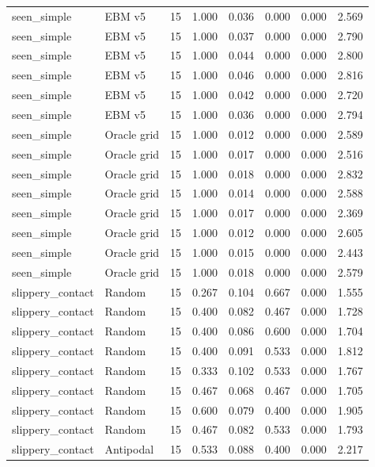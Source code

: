 {\begin{longtable}{llrrrrrr}
seen\_simple & EBM v5 & 15 & 1.000 & 0.036 & 0.000 & 0.000 & 2.569 \\
seen\_simple & EBM v5 & 15 & 1.000 & 0.037 & 0.000 & 0.000 & 2.790 \\
seen\_simple & EBM v5 & 15 & 1.000 & 0.044 & 0.000 & 0.000 & 2.800 \\
seen\_simple & EBM v5 & 15 & 1.000 & 0.046 & 0.000 & 0.000 & 2.816 \\
seen\_simple & EBM v5 & 15 & 1.000 & 0.042 & 0.000 & 0.000 & 2.720 \\
seen\_simple & EBM v5 & 15 & 1.000 & 0.036 & 0.000 & 0.000 & 2.794 \\
seen\_simple & Oracle grid & 15 & 1.000 & 0.012 & 0.000 & 0.000 & 2.589 \\
seen\_simple & Oracle grid & 15 & 1.000 & 0.017 & 0.000 & 0.000 & 2.516 \\
seen\_simple & Oracle grid & 15 & 1.000 & 0.018 & 0.000 & 0.000 & 2.832 \\
seen\_simple & Oracle grid & 15 & 1.000 & 0.014 & 0.000 & 0.000 & 2.588 \\
seen\_simple & Oracle grid & 15 & 1.000 & 0.017 & 0.000 & 0.000 & 2.369 \\
seen\_simple & Oracle grid & 15 & 1.000 & 0.012 & 0.000 & 0.000 & 2.605 \\
seen\_simple & Oracle grid & 15 & 1.000 & 0.015 & 0.000 & 0.000 & 2.443 \\
seen\_simple & Oracle grid & 15 & 1.000 & 0.018 & 0.000 & 0.000 & 2.579 \\
slippery\_contact & Random & 15 & 0.267 & 0.104 & 0.667 & 0.000 & 1.555 \\
slippery\_contact & Random & 15 & 0.400 & 0.082 & 0.467 & 0.000 & 1.728 \\
slippery\_contact & Random & 15 & 0.400 & 0.086 & 0.600 & 0.000 & 1.704 \\
slippery\_contact & Random & 15 & 0.400 & 0.091 & 0.533 & 0.000 & 1.812 \\
slippery\_contact & Random & 15 & 0.333 & 0.102 & 0.533 & 0.000 & 1.767 \\
slippery\_contact & Random & 15 & 0.467 & 0.068 & 0.467 & 0.000 & 1.705 \\
slippery\_contact & Random & 15 & 0.600 & 0.079 & 0.400 & 0.000 & 1.905 \\
slippery\_contact & Random & 15 & 0.467 & 0.082 & 0.533 & 0.000 & 1.793 \\
slippery\_contact & Antipodal & 15 & 0.533 & 0.088 & 0.400 & 0.000 & 2.217 \\

\end{longtable}}
